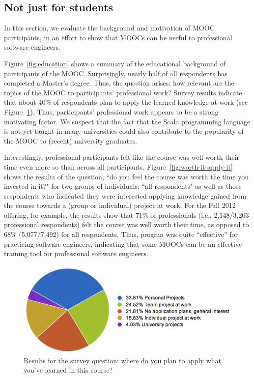 \documentclass{sig-alternate}
\begin{document}
\subsection{Not just for students}

In this section, we evaluate the background and motivation of MOOC participants,
in an effort to show that MOOCs can be useful to professional software engineers.

Figure~\ref{fig:education} shows a summary of the educational background of
participants of the MOOC. Surprisingly, nearly half of all respondents has completed a
Master's degree. Thus, the question arises: how relevant are the topics of the
MOOC to participants' professional work? Survey results indicate that about
40\% of respondents plan to apply the learned knowledge at work (see
Figure~\ref{fig:where-apply}). Thus, participants' professional work appears
to be a strong motivating factor. We suspect that the fact that the Scala
programming language is not yet taught in many universities could also
contribute to the popularity of the MOOC to (recent) university graduates.

Interestingly, professional participants felt like the course was well worth
their time even more so than across all participants. Figure~\ref{fig:worth-it-apply-it}
shows the results of the question, ``do you feel the course was worth the time you invested in it?"
for two groups of individuals; ``all respondents" as well as those respondents who
indicated they were interested applying knowledge gained from the course towards a
(group or individual) project at work. For the Fall 2012 offering, for example, the
results show that 71\% of professionals (i.e., 2,148/3,203 professional respondents)
felt the course was well worth their time, as opposed to 68\% (5,077/7,492) for all respondents.
Thus, progfun was quite ``effective'' for practicing software engineers, indicating
that some MOOCs can be an effective training tool for professional software engineers.

\begin{figure}[ht!]
  \centering
  \includegraphics[width=\columnwidth]{plots/where-apply.png}
  \caption{Results for the survey question: where do you plan to apply what you've learned in this course?}
  \label{fig:where-apply}
\end{figure}
\end{document}
